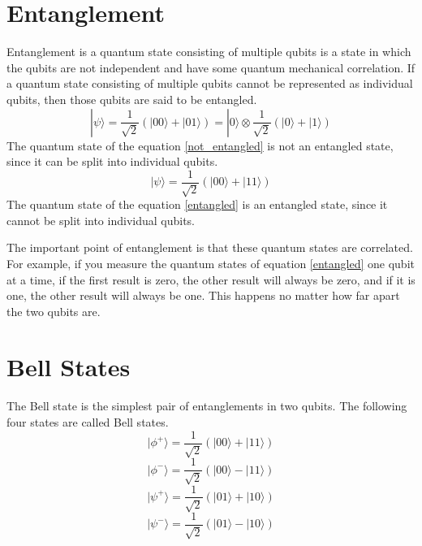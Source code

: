 \section{Entanglement}
\label{entanglement}
Entanglement is a quantum state consisting of multiple qubits is a state in which the qubits are not independent and have some quantum mechanical correlation\cite{nielsen}.
If a quantum state consisting of multiple qubits cannot be represented as individual qubits, then those qubits are said to be entangled.
\begin{equation}
    \label{not_entangled}
    |\psi\rangle = \frac{1}{\sqrt{2}} (|00\rangle + |01\rangle)
    = |0\rangle \otimes \frac{1}{\sqrt{2}}(|0\rangle + |1\rangle)
\end{equation}
The quantum state of the equation \ref{not_entangled} is not an entangled state, since it can be split into individual qubits.
\begin{equation}
    \label{entangled}
    |\psi\rangle = \frac{1}{\sqrt{2}} (|00\rangle + |11\rangle)
\end{equation}
The quantum state of the equation \ref{entangled} is an entangled state, since it cannot be split into individual qubits.

The important point of entanglement is that these quantum states are correlated.
For example, if you measure the quantum states of equation \ref{entangled} one qubit at a time, if the first result is zero, the other result will always be zero, and if it is one, the other result will always be one. 
This happens no matter how far apart the two qubits are.

\section{Bell States}
The Bell state is the simplest pair of entanglements in two qubits. 
The following four states are called Bell states.
\begin{equation}
    |\phi^+\rangle = \frac{1}{\sqrt{2}} (|00\rangle + |11\rangle)
\end{equation}
\begin{equation}
    |\phi^-\rangle = \frac{1}{\sqrt{2}} (|00\rangle - |11\rangle)
\end{equation}
\begin{equation}
    |\psi^+\rangle = \frac{1}{\sqrt{2}} (|01\rangle + |10\rangle)
\end{equation}
\begin{equation}
    |\psi^-\rangle = \frac{1}{\sqrt{2}} (|01\rangle - |10\rangle)
\end{equation}

